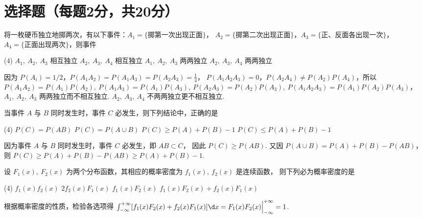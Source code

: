 \section{选择题（每题2分，共20分）}

\begin{problem}
  将一枚硬币独立地掷两次，有以下事件：$A_1 = \{\text{掷第一次出现正面}\}$，
  $A_2 = \{\text{掷第二次出现正面}\}$，$A_3 = \{\text{正、反面各出现一次}\}$，
  $A_4 = \{\text{正面出现两次}\}$，则事件
\begin{tasks}(4)
  \task $A_1,~ A_2,~ A_3$ 相互独立
  \task $A_2,~ A_3,~ A_4$ 相互独立
  \task[\true] $A_1,~ A_2,~ A_3$ 两两独立
  \task $A_2,~ A_3,~ A_4$ 两两独立
\end{tasks}
\end{problem}
\scratch[10ex]
\begin{solution}
  因为 $P(A_i) = 1/2$，$P(A_1A_2) = P(A_1A_3) = P(A_2A_3) = \frac14$，
  $P(A_1A_2A_3) = 0$，$P(A_2A_4) \neq P(A_2) P(A_4)$，所以
  $ P(A_1A_2) = P(A_1)P(A_2),~ P(A_1A_3) = P(A_1)P(A_3),~
    P(A_2A_3) = P(A_2)P(A_3),~ P(A_1A_2A_3) = P(A_1)P(A_2)P(A_3)
  $，$A_1,~ A_2,~ A_3$ 两两独立而不相互独立. $A_2,~ A_3,~ A_4$ 不两两独立更不相互独立.
\end{solution}

\begin{problem}
  当事件 $A$ 与 $B$ 同时发生时，事件 $C$ 必发生，则下列结论中，正确的是
  \begin{tasks}(4)
    \task $P(C) = P(AB)$
    \task $P(C) = P(A \cup B)$
    \task[\true] $P(C) \geq P(A) + P(B) - 1$
    \task $P(C) \leq P(A) + P(B) - 1$
  \end{tasks}
\end{problem}
\scratch[4ex]
\begin{solution}
  因为事件 $A$ 与 $B$ 同时发生时，事件 $C$ 必发生，即 $AB \subset C$，
  因此 $P(C) \geq P(AB)$. 又因 $P(A \cup B) = P(A) + P(B) - P(AB)$，
  则 $P(C) \geq P(A) + P(B) - P(AB) \geq P(A) + P(B) - 1$.
\end{solution}

\begin{problem}
  设 $F_1(x),~ F_2(x)$ 为两个分布函数，其相应的概率密度为 $f_1(x),~ f_2(x)$ 是连续函数，
  则下列必为概率密度的是
  \begin{tasks}(4)
    \task $f_1(x) f_2(x)$
    \task $2 f_2(x) F_1(x)$
    \task $f_1(x) F_2(x)$
    \task[\true] $f_1(x) F_2(x) + f_2(x) F_1(x)$
  \end{tasks}
\end{problem}
\scratch[2ex]
\begin{solution}
  根据概率密度的性质，检验各选项得
  $ \int_{-\infty}^{+\infty} [f_1(x) F_2(x) + f_2(x) F_1(x)] \d x
  = F_1(x) F_2(x) \Big|_{-\infty}^{+\infty} = 1$.
\end{solution}

